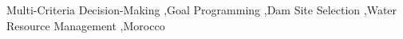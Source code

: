 \begin{frontmatter}


    \begin{keyword}
        Multi-Criteria Decision-Making \sep Goal Programming \sep Dam Site Selection \sep Water Resource Management \sep Morocco
    \end{keyword}

\end{frontmatter}   
